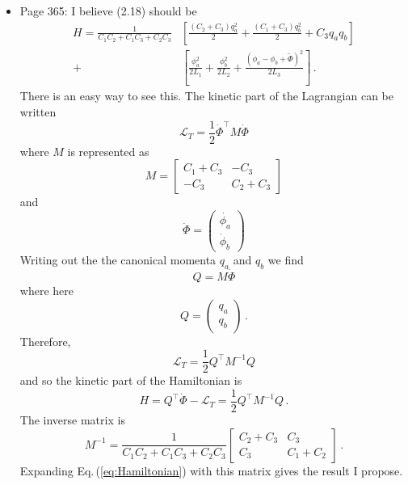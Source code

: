 \documentclass{article}
\begin{document}
\begin{itemize}
\item Page 365: I believe (2.18) should be
\begin{align}
H = \frac{1}{C_1 C_2 + C_1 C_3 + C_2 C_3} & \left[
\frac{(C_2 + C_3) q_a^2}{2}
+ \frac{(C_1 + C_3)q_b^2}{2}
+ C_3 q_a q_b \right] \nonumber \\
+ & \left[
\frac{\phi_a^2}{2 L_1} + \frac{\phi_b^2}{2 L_2} + \frac{(\phi_a - \phi_b + \tilde{\Phi})^2}{2 L_3} \right] \nonumber \, .
\end{align}
There is an easy way to see this.
The kinetic part of the Lagrangian can be written
\begin{equation*}
\mathcal{L}_{T} = \frac{1}{2} \dot{\Phi}^\top M \dot{\Phi}
\end{equation*}
where $M$ is represented as
\begin{equation*}
M = \left[ \begin{array} {cc} C_1 + C_3 & -C_3 \\ -C_3 & C_2 + C_3 \end{array} \right]
\end{equation*}
and
\begin{equation*}
\dot{\Phi} = \left( \begin{array}{c} \dot{\phi_a} \\ \dot{\phi}_b \end{array} \right)
\end{equation*}
Writing out the the canonical momenta $q_a$ and $q_b$ we find
\begin{equation*}
Q = M \dot{\Phi}
\end{equation*}
where here
\begin{equation*}
Q = \left( \begin{array}{c} q_a \\ q_b \end{array} \right) \, .
\end{equation*}
Therefore,
\begin{equation*}
\mathcal{L}_T = \frac{1}{2} Q^\top M^{-1} Q
\end{equation*}
and so the kinetic part of the Hamiltonian is
\begin{equation}
H = Q^\top \dot{\Phi} - \mathcal{L}_T = \frac{1}{2} Q^\top M^{-1} Q \label{eq:Hamiltonian} \, .
\end{equation}
The inverse matrix is
\begin{equation*}
M^{-1} = \frac{1}{C_1 C_2 + C_1 C_3 + C_2 C_3}
\left[ \begin{array}{cc} C_2 + C_3  & C_3 \\ C_3 & C_1 + C_2 \end{array} \right] \, .
\end{equation*}
Expanding Eq.\,(\ref{eq:Hamiltonian}) with this matrix gives the result I propose.


\end{itemize}
\end{document}
